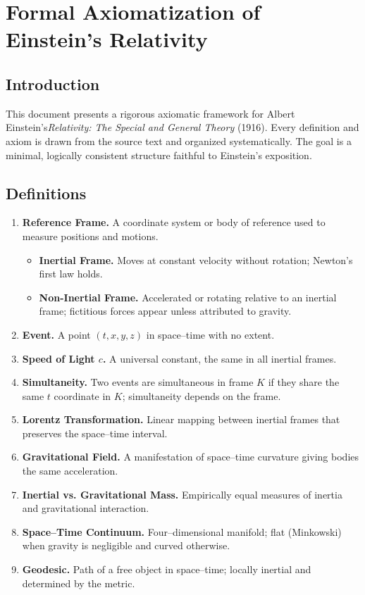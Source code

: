 \documentclass[11pt]{article}
\begin{document}
\section*{Formal Axiomatization of Einstein's Relativity}

\subsection*{Introduction}
This document presents a rigorous axiomatic framework for Albert Einstein's\textit{Relativity: The Special and General Theory} (1916). Every definition and axiom is drawn from the source text and organized systematically. The goal is a minimal, logically consistent structure faithful to Einstein's exposition.

\subsection*{Definitions}
\begin{enumerate}
  \item \textbf{Reference Frame.} A coordinate system or body of reference used to measure positions and motions.
  \begin{itemize}
    \item \textbf{Inertial Frame.} Moves at constant velocity without rotation; Newton's first law holds.
    \item \textbf{Non-Inertial Frame.} Accelerated or rotating relative to an inertial frame; fictitious forces appear unless attributed to gravity.
  \end{itemize}
  \item \textbf{Event.} A point $(t,x,y,z)$ in space--time with no extent.
  \item \textbf{Speed of Light $c$.} A universal constant, the same in all inertial frames.
  \item \textbf{Simultaneity.} Two events are simultaneous in frame $K$ if they share the same $t$ coordinate in $K$; simultaneity depends on the frame.
  \item \textbf{Lorentz Transformation.} Linear mapping between inertial frames that preserves the space--time interval.
  \item \textbf{Gravitational Field.} A manifestation of space--time curvature giving bodies the same acceleration.
  \item \textbf{Inertial vs. Gravitational Mass.} Empirically equal measures of inertia and gravitational interaction.
  \item \textbf{Space--Time Continuum.} Four--dimensional manifold; flat (Minkowski) when gravity is negligible and curved otherwise.
  \item \textbf{Geodesic.} Path of a free object in space--time; locally inertial and determined by the metric.
\end{enumerate}
\end{document}
